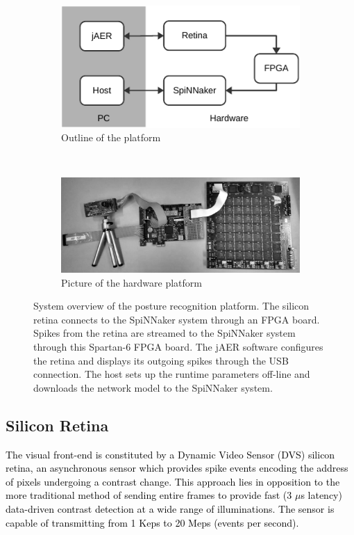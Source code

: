 \documentclass[journal]{journal}
\begin{document}
\begin{figure}
\centering
	\begin{subfigure}[t]{0.4\textwidth}
		\includegraphics[width=\textwidth]{pics/outline.pdf}
	    \caption{Outline of the platform}
	    \label{fig:SysOverViewa}
	\end{subfigure}
	\\
	\begin{subfigure}[t]{0.48\textwidth}
		\includegraphics[width=\textwidth]{pics/outline2.pdf}	    \caption{Picture of the hardware platform}
	    \label{fig:SysOverViewb}
	\end{subfigure}	

\caption{System overview of the posture recognition platform. The silicon retina connects to the SpiNNaker system through an FPGA board. 
Spikes from the retina are streamed to the SpiNNaker system through this Spartan-6 FPGA board.
The jAER software configures the retina and displays its outgoing spikes through the USB connection.
The host sets up the runtime parameters off-line and downloads the network model to the SpiNNaker system.
}
\label{fig:SysOverView}
\end{figure}

\subsection{Silicon Retina}
\textcolor{black}{
The visual front-end is constituted by a Dynamic Video Sensor (DVS) silicon retina, an asynchronous sensor which provides spike events encoding the address of pixels undergoing a contrast change\cite{wei2006robust}. 
This approach lies in opposition to the more traditional method of sending entire frames to provide fast (3 $\mu$s latency) data-driven contrast detection at a wide range of illuminations. 
The sensor is capable of transmitting from 1 Keps to 20 Meps (events per
second).}
\end{document}
